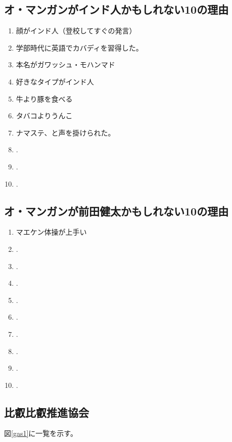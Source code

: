 \documentclass[12pt]{jsarticle}
\begin{document}
\newpage
\subsection{オ・マンガンがインド人かもしれない10の理由}
\begin{enumerate}
\item 顔がインド人（登校してすぐの発言）
\item 学部時代に英語でカバディを習得した。
\item 本名がガワッシュ・モハンマド
\item 好きなタイプがインド人
\item 牛より豚を食べる
\item タバコよりうんこ
\item ナマステ、と声を掛けられた。
\item .
\item .
\item .
\end{enumerate}

\subsection{オ・マンガンが前田健太かもしれない10の理由}
\begin{enumerate}
\item マエケン体操が上手い
\item .
\item .
\item .
\item .
\item .
\item .
\item .
\item .
\item .
\end{enumerate}

\newpage
\subsection{比叡比叡推進協会}
図\ref{gas1}に一覧を示す。
\end{document}
